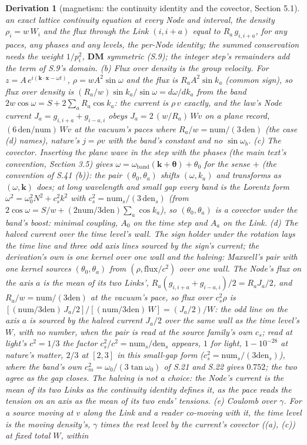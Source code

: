 \documentclass[pdflatex,sn-mathphys-num]{sn-jnl}
\newcommand{\num}{\mathrm{num}}
\newcommand{\den}{\mathrm{den}}
\theoremstyle{thmstyleone}
\newtheorem{derivation}{Derivation}
\begin{document}
\begin{derivation}[magnetism: the continuity identity and the covector, Section 5.1]
an exact lattice continuity equation at every Node and interval, the density $\rho_i = w\,W_i$ and the flux through the Link $(i, i+a)$ equal to $R_a\,g_{i,i+a}$, for any paces, any phases and any levels, the per-Node identity; the summed conservation needs the weight $1 / p_i^2$, $\mathbf D\mathbf M$ symmetric (S.9); the integer step's remainders add the term of S.9's domain. (b) \emph{Flux over density is the group velocity.} For $z = A\,e^{i(\mathbf k\cdot\mathbf x - \omega t)}$, $\rho = w A^2\sin\omega$ and the flux is $R_a A^2 \sin k_a$ (common sign), so flux over density is $(R_a / w)\sin k_a / \sin\omega = d\omega / dk_a$ from the band $2w\cos\omega = S + 2\sum_a R_a\cos k_a$: the current is $\rho\,v$ exactly, and the law's Node current $J_a = g_{i,i+a} + g_{i-a,i}$ obeys $J_a = 2\,(w / R_a)\,W v$ on a plane record, $(6\,\den / \num)\,W v$ at the vacuum's paces where $R_a / w = \num / (3\,\den)$ (the case (d) names), nature's $j = \rho v$ with the band's constant and no $\sin\omega_b$. (c) \emph{The covector.} Inserting the plane wave in the step with the phases (the main text's convention, Section 3.5) gives $\omega = \omega_{\mathrm{band}}(\mathbf k + \boldsymbol\theta) + \theta_0$ for the sense $+$ (the convention of S.41 (b)): the pair $(\theta_0, \theta_a)$ shifts $(\omega, k_a)$ and transforms as $(\omega, \mathbf k)$ does; at long wavelength and small gap every band is the Lorentz form $\omega^2 = \omega_0^2 N^2 + c_s^2 k^2$ with $c_s^2 = \num_s / (3\,\den_s)$ (from $2\cos\omega = S / w + (2\num / 3\den)\sum_a\cos k_a$), so $(\theta_0, \theta_a)$ is a covector under the band's boost: minimal coupling, $A_0$ on the time step and $A_a$ on the Link. (d) \emph{The halved current over the time level's wall.} The sign holder under the rotation lays the time line and three odd axis lines sourced by the sign's current; the derivation's own is one kernel over one wall and the halving: Maxwell's pair with one kernel sources $(\theta_0, \theta_a)$ from $(\rho, \text{flux} / c^2)$ over one wall. The Node's flux on the axis $a$ is the mean of its two Links', $R_a (g_{i,i+a} + g_{i-a,i}) / 2 = R_a J_a / 2$, and $R_a / w = \num / (3\den)$ at the vacuum's pace, so flux over $c_s^2\rho$ is $[(\num / 3\den)\,J_a / 2] / [(\num / 3\den)\,W] = (J_a / 2) / W$: the odd line on the axis $a$ is sourced by the halved current $J_a / 2$ over the same wall as the time level's $W$, with no number, when the pair is read at the source family's own $c_s$; read at light's $c^2 = 1 / 3$ the factor $c_s^2 / c^2 = \num_s / \den_s$ appears, $1$ for light, $1 - 10^{-28}$ at nature's matter, $2 / 3$ at $[2, 3]$ in this small-gap form ($c_s^2 = \num_s / (3\den_s)$), where the band's own $c_m^2 = \omega_0 / (3\tan\omega_0)$ of S.21 and S.22 gives $0.752$; the two agree as the gap closes. The halving is not a choice: the Node's current is the mean of its two Links as the continuity identity defines it, as the pace reads the tension on an axis as the mean of its two ends' tensions. (e) \emph{Coulomb over $\gamma$.} For a source moving at $v$ along the Link and a reader co-moving with it, the time level is the moving density's, $\gamma$ times the rest level by the current's covector ((a), (c)) at fixed total $W$, within 
\end{derivation}
\end{document}
